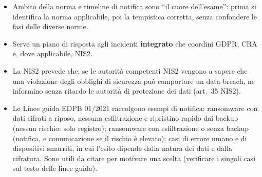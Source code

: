 \begin{esame}
\begin{itemize}
  \item Ambito della norma e timeline di notifica sono ``il cuore dell'esame'': prima si identifica la
    norma applicabile, poi la tempistica corretta, senza confondere le fasi delle diverse norme.
  \item Serve un piano di risposta agli incidenti \textbf{integrato} che coordini GDPR, CRA e, dove
    applicabile, NIS2.
\end{itemize}
\end{esame}

\begin{integrazione}
\begin{itemize}
  \item La NIS2 prevede che, se le autorità competenti NIS2 vengono a sapere che una violazione degli
    obblighi di sicurezza può comportare un data breach, ne informino senza ritardo le autorità di
    protezione dei dati (art.~35 NIS2).
  \item Le Linee guida EDPB 01/2021 raccolgono esempi di notifica: ransomware con dati cifrati a riposo,
    nessuna esfiltrazione e ripristino rapido dai backup (nessun rischio: solo registro); ransomware con
    esfiltrazione o senza backup (notifica, e comunicazione se il rischio è elevato); casi di errore umano
    e di dispositivi smarriti, in cui l'esito dipende dalla natura dei dati e dalla cifratura. Sono utili
    da citare per motivare una scelta (verificare i singoli casi sul testo delle linee guida).
\end{itemize}
\end{integrazione}

